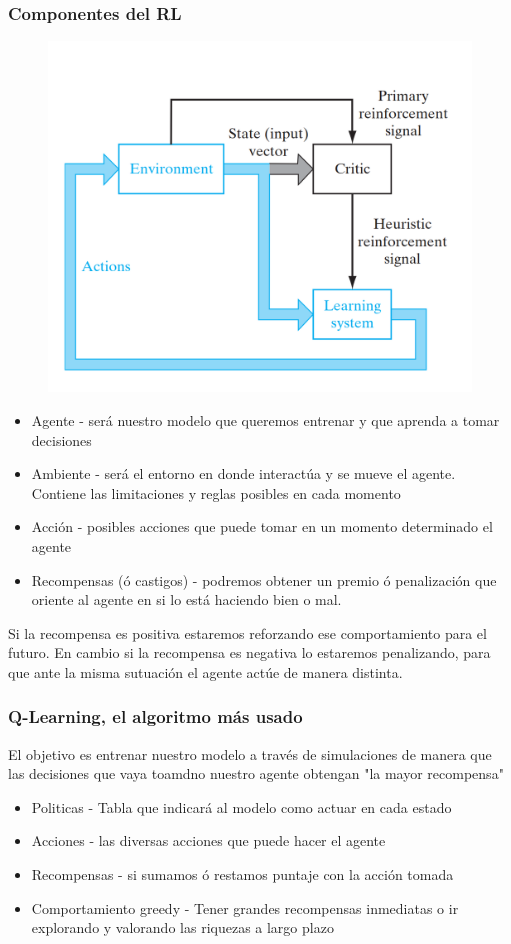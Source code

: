 \documentclass[
	11pt, %
]{beamer}
\begin{document}
\begin{frame}
  \frametitle{Componentes del RL}

  \begin{figure}
    \includegraphics[width=0.3\linewidth]{RL.png}
  \end{figure}
  
  \begin{itemize}
  \item Agente - será nuestro modelo que queremos entrenar y que aprenda a tomar decisiones
  \item Ambiente - será el entorno en donde interactúa y se mueve el agente. Contiene las limitaciones y reglas posibles en cada momento
  \item Acción - posibles acciones que puede tomar en un momento determinado el agente
  \item Recompensas (ó castigos) - podremos obtener un premio ó penalización que oriente al agente en si lo está haciendo bien o mal.
  \end{itemize}

  \bigskip %
  
  Si la recompensa es positiva estaremos \alert{reforzando} ese comportamiento para el futuro. En cambio si la recompensa es negativa lo estaremos penalizando, para que ante la misma sutuación el agente actúe de manera distinta. 
  
\end{frame}

\begin{frame}
  \frametitle{Q-Learning, el algoritmo más usado}

  El objetivo es entrenar nuestro modelo a través de simulaciones de manera que las decisiones que vaya toamdno nuestro agente obtengan "la mayor recompensa"
  
  \begin{itemize}
  \item Politicas - Tabla que indicará al modelo como actuar en cada estado
  \item Acciones - las diversas acciones que puede hacer el agente
  \item Recompensas - si sumamos ó restamos puntaje con la acción tomada
  \item Comportamiento greedy - Tener grandes recompensas inmediatas o ir explorando y valorando las riquezas a largo plazo
  \end{itemize}

  
\end{frame}
\end{document}
